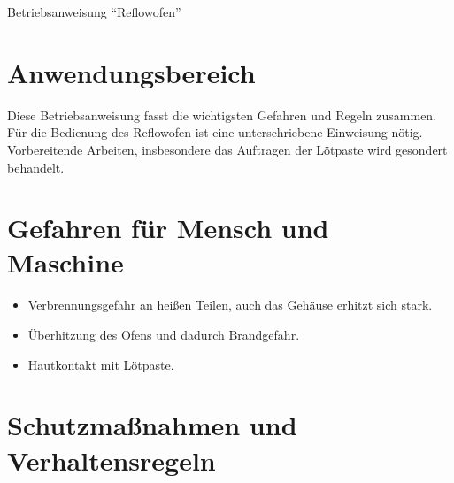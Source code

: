 \documentclass[fontsize=9pt]{scrartcl}
\newenvironment{smallitemize}{\begin{itemize}\itemsep -3pt}{\end{itemize}}
\begin{document}

\begin{center}
	\LARGE{Betriebsanweisung \enquote{Reflowofen}}
\end{center}


\section{Anwendungsbereich}
\begin{center}
	Diese Betriebsanweisung fasst die wichtigsten Gefahren und Regeln zusammen.\\
	Für die Bedienung des Reflowofen ist eine unterschriebene Einweisung nötig.\\
	Vorbereitende Arbeiten, insbesondere das Auftragen der Lötpaste wird gesondert behandelt.\\
\end{center}

\section{Gefahren für Mensch und Maschine}

\begin{smallitemize}
	\item Verbrennungsgefahr an heißen Teilen, auch das Gehäuse erhitzt sich stark.
	\item Überhitzung des Ofens und dadurch Brandgefahr.
	\item Hautkontakt mit Lötpaste.
	\end{smallitemize}

\section{Schutzmaßnahmen und Verhaltensregeln}
\end{document}

